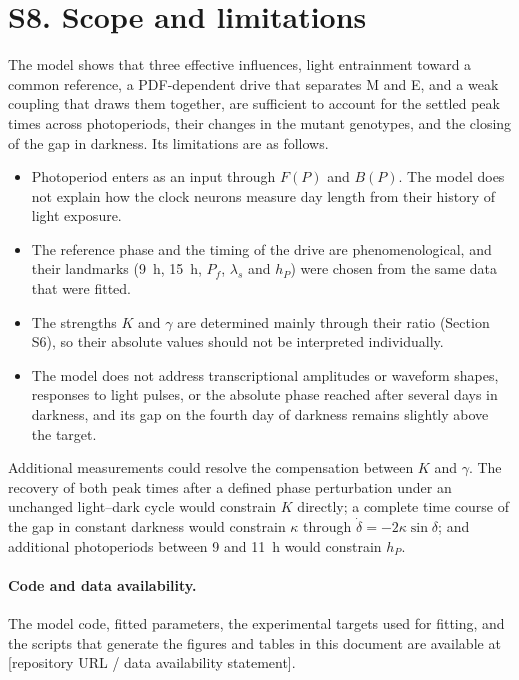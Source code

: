 \documentclass[10pt,a4paper]{article}
\begin{document}
\section*{S8. Scope and limitations}
The model shows that three effective influences, light entrainment toward
a common reference, a PDF-dependent drive that separates M and E, and a
weak coupling that draws them together, are sufficient to account for
the settled peak times across photoperiods, their changes in the mutant
genotypes, and the closing of the gap in darkness. Its limitations are
as follows.
\begin{itemize}
\item Photoperiod enters as an input through $F(P)$ and $B(P)$. The
model does not explain how the clock neurons measure day length from
their history of light exposure.
\item The reference phase and the timing of the drive are
phenomenological, and their landmarks (9~h, 15~h, $P_f$, $\lambda_s$ and
$h_P$) were chosen from the same data that were fitted.
\item The strengths $K$ and $\gamma$ are determined mainly through their
ratio (Section S6), so their absolute values should not be interpreted
individually.
\item The model does not address transcriptional amplitudes or waveform
shapes, responses to light pulses, or the absolute phase reached after
several days in darkness, and its gap on the fourth day of darkness
remains slightly above the target.
\end{itemize}
Additional measurements could resolve the compensation between $K$ and
$\gamma$. The recovery of both peak times after a defined phase
perturbation under an unchanged light--dark cycle would constrain $K$
directly; a complete time course of the gap in constant darkness would
constrain $\kappa$ through $\dot\delta=-2\kappa\sin\delta$; and
additional photoperiods between 9 and 11~h would constrain $h_P$.

\paragraph{Code and data availability.}
The model code, fitted parameters, the experimental targets used for
fitting, and the scripts that generate the figures and tables in this
document are available at [repository URL / data availability
statement].
\end{document}

